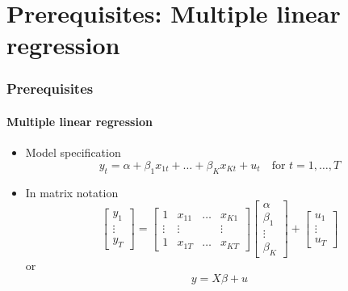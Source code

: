 \documentclass[notes=show]{beamer}
\begin{document}
\section{Prerequisites: Multiple linear regression}

\begin{frame}\frametitle{Prerequisites}\framesubtitle{Multiple linear regression}
\begin{itemize}
    \item Model specification
        \begin{equation*}
            y_{t}=\alpha +\beta _{1}x_{1t}+\ldots +\beta _{K}x_{Kt}+u_{t}\quad \text{for }t=1,\ldots ,T
        \end{equation*}
    \item In matrix notation
      \begin{equation*}
        \left[
        \begin{array}{c}
        y_{1} \\
        \vdots \\
        y_{T}%
        \end{array}
        \right] =\left[
        \begin{array}{llll}
        1 & x_{11} & \ldots & x_{K1} \\
        \vdots & \vdots &  & \vdots \\
        1 & x_{1T} & \ldots & x_{KT}
        \end{array}
        \right] \left[
        \begin{array}{c}
        \alpha \\
        \beta _{1} \\
        \vdots \\
        \beta _{K}
        \end{array}
        \right] +\left[
        \begin{array}{c}
        u_{1} \\
        \vdots \\
        u_{T}
        \end{array}
        \right]
    \end{equation*}
    or
    \begin{equation*}
        y=X\beta +u
    \end{equation*}
\end{itemize}
\end{frame}
\end{document}
